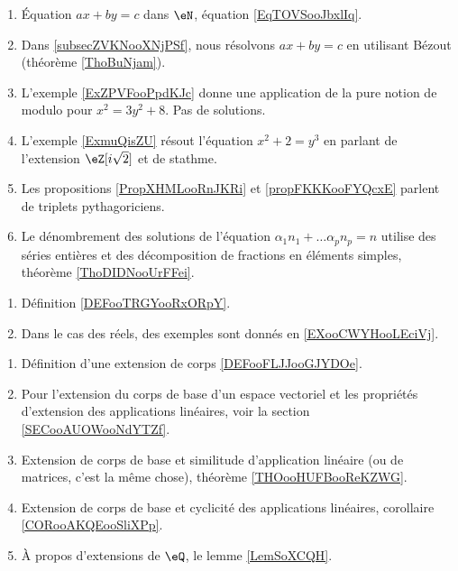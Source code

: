     \begin{enumerate}
        \item
            Équation \( ax+by=c\) dans \( \eN\), équation \eqref{EqTOVSooJbxlIq}.
        \item Dans \ref{subsecZVKNooXNjPSf}, nous résolvons \( ax+by=c\) en utilisant Bézout (théorème \ref{ThoBuNjam}).
        \item L'exemple \ref{ExZPVFooPpdKJc} donne une application de la pure notion de modulo pour \( x^2=3y^2+8\). Pas de solutions.
        \item L'exemple \ref{ExmuQisZU} résout l'équation \( x^2+2=y^3\) en parlant de l'extension \( \eZ[i\sqrt{2}]\) et de stathme.
        \item Les propositions \ref{PropXHMLooRnJKRi} et \ref{propFKKKooFYQcxE} parlent de triplets pythagoriciens.
        \item Le dénombrement des solutions de l'équation \( \alpha_1 n_1+\ldots \alpha_pn_p=n\) utilise des séries entières et des décomposition de fractions en éléments simples, théorème \ref{ThoDIDNooUrFFei}.
        \end{enumerate}

    \begin{enumerate}
        \item
            Définition \ref{DEFooTRGYooRxORpY}.
        \item
            Dans le cas des réels, des exemples sont donnés en \ref{EXooCWYHooLEciVj}.
        \end{enumerate}

    \begin{enumerate}
        \item
            Définition d'une extension de corps \ref{DEFooFLJJooGJYDOe}.
        \item
            Pour l'extension du corps de base d'un espace vectoriel et les propriétés d'extension des applications linéaires, voir la section \ref{SECooAUOWooNdYTZf}.
        \item
            Extension de corps de base et similitude d'application linéaire (ou de matrices, c'est la même chose), théorème \ref{THOooHUFBooReKZWG}.
        \item
            Extension de corps de base et cyclicité des applications linéaires, corollaire \ref{CORooAKQEooSliXPp}.
        \item 
            À propos d'extensions de \( \eQ\), le lemme \ref{LemSoXCQH}.
    \end{enumerate}

